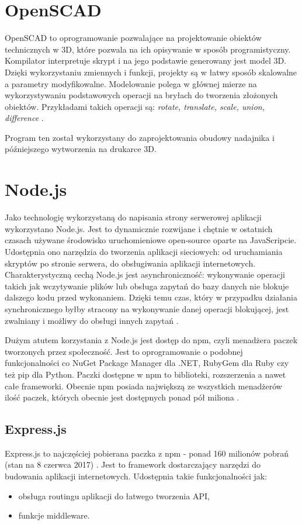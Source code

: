 \documentclass[eng,printmode]{mgr}
\begin{document}
\section{OpenSCAD}
OpenSCAD to oprogramowanie pozwalające na projektowanie obiektów technicznych w 3D, które pozwala na ich opisywanie w sposób programistyczny. Kompilator interpretuje skrypt i na jego podstawie generowany jest model 3D. Dzięki wykorzystaniu zmiennych i funkcji, projekty są w łatwy sposób skalowalne a parametry modyfikowalne. Modelowanie polega w głównej mierze na wykorzystywaniu podstawowych operacji na bryłach do tworzenia złożonych obiektów. Przykładami takich operacji są: \textit{rotate, translate, scale, union, difference} \cite{openscad}.

Program ten został wykorzystany do zaprojektowania obudowy nadajnika i późniejszego wytworzenia na drukarce 3D.


\section{Node.js}
Jako technologię wykorzystaną do napisania strony serwerowej aplikacji wykorzystano Node.js. Jest to dynamicznie rozwijane i chętnie w ostatnich czasach używane środowisko uruchomieniowe open-source oparte na JavaScripcie. Udostępnia ono narzędzia do tworzenia aplikacji sieciowych: od uruchamiania skryptów po stronie serwera, do obsługiwania aplikacji internetowych. Charakterystyczną cechą Node.js jest asynchroniczność: wykonywanie operacji takich jak wczytywanie plików lub obsługa zapytań do bazy danych nie blokuje dalszego kodu przed wykonaniem. Dzięki temu czas, który w przypadku działania synchronicznego byłby stracony na wykonywanie danej operacji blokującej, jest zwalniany i możliwy do obsługi innych zapytań \cite{nodejs_blocking}.

Dużym atutem korzystania z Node.js jest dostęp do npm, czyli menadżera paczek tworzonych przez społeczność. Jest to oprogramowanie o podobnej funkcjonalności co NuGet Package Manager dla .NET, RubyGem dla Ruby czy też pip dla Python. Paczki dostępne w npm to biblioteki, rozszerzenia a nawet całe frameworki. Obecnie npm posiada największą ze wszystkich menadżerów ilość paczek, których obecnie jest dostępnych ponad pół miliona \cite{module_counts}.

\subsection{Express.js}
Express.js to najczęściej pobierana paczka z npm - ponad 160 milionów pobrań (stan na 8 czerwca 2017) \cite{express_popularity}. Jest to framework dostarczający narzędzi do budowania aplikacji internetowych. Udostępnia takie funkcjonalności jak:
\begin{itemize}
\item obsługa routingu aplikacji do łatwego tworzenia API,
\item funkcje middleware.
\end{itemize}
\end{document}

